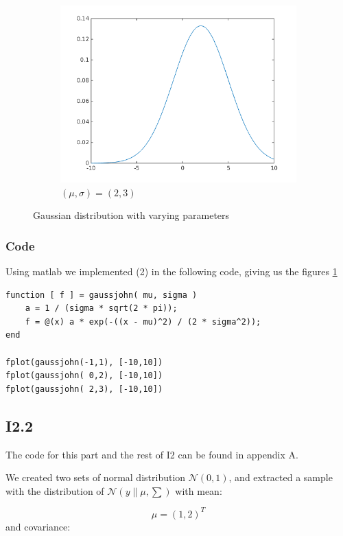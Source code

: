 \documentclass{article}
\begin{document}
\begin{figure}[!ht]
\begin{subfigure}[b]{0.4\textwidth}
        \includegraphics[width=\textwidth]{part1/I213.png}
        \caption{$(\mu, \sigma) = (2,3)$}
    \end{subfigure}
    \caption{Gaussian distribution with varying parameters}
    \label{fig:I1.1}
\end{figure}

\subsubsection{Code}

Using matlab we implemented (2) in the following code, giving us the
figures \ref{fig:I1.1}

\begin{verbatim}
function [ f ] = gaussjohn( mu, sigma )
    a = 1 / (sigma * sqrt(2 * pi));
    f = @(x) a * exp(-((x - mu)^2) / (2 * sigma^2));
end

fplot(gaussjohn(-1,1), [-10,10])
fplot(gaussjohn( 0,2), [-10,10])
fplot(gaussjohn( 2,3), [-10,10])
\end{verbatim}

\subsection{I2.2}

The code for this part and the rest of I2 can be found in appendix A.

We created two sets of normal distribution $\mathscr{N}(0,1)$, and extracted a sample with the distribution of $\mathscr{N}(y \| \mu, \sum)$ 
with mean:

\begin{equation}\label{eq:2.2mean}
    \mu = (1,2)^T
\end{equation} 
and covariance:
\end{document}
